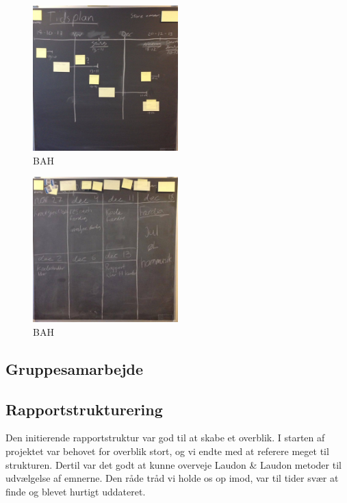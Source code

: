 \documentclass[a4paper,12pt, article]{memoir}
\begin{document}
            \begin{figure}[ht!]
                \centering
                \includegraphics[width=0.5\textwidth]{Images/9.jpg}
                \caption{BAH}
                \label{4}
            \end{figure}

            \begin{figure}[ht!]
                \centering
                \includegraphics[width=0.5\textwidth]{Images/2.jpg}
                \caption{BAH}
                \label{4}
            \end{figure}

\subsection{Gruppesamarbejde}



\subsection{Rapportstrukturering}

Den initierende rapportstruktur var god til at skabe et overblik. I starten af projektet var behovet for overblik stort, og vi endte med at referere meget til strukturen. Dertil var det godt at kunne overveje Laudon \& Laudon metoder til udvælgelse af emnerne. Den råde tråd vi holde os op imod, var til tider svær at finde og blevet hurtigt uddateret.
\end{document}
